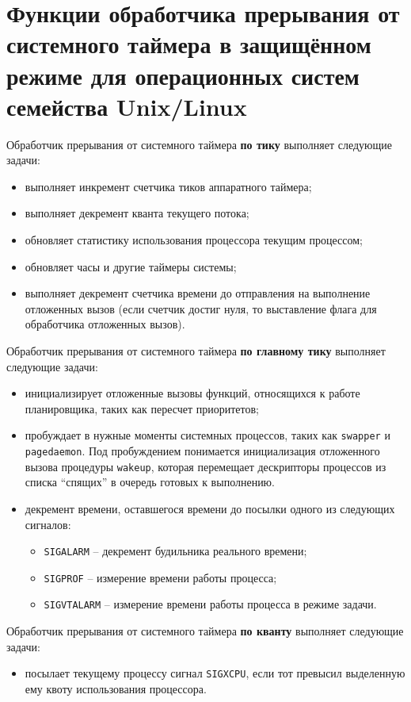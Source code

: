 \chapter{Функции обработчика прерывания от системного таймера в защищённом режиме для операционных систем семейства Unix/Linux}

Обработчик прерывания от системного таймера \textbf{по тику} выполняет следующие задачи:
\begin{itemize}
    \item выполняет инкремент счетчика тиков аппаратного таймера;
    \item выполняет декремент кванта текущего потока;
    \item обновляет статистику использования процессора текущим процессом;
    \item обновляет часы и другие таймеры системы;
    \item выполняет декремент счетчика времени до отправления на выполнение отложенных вызов (если счетчик достиг нуля, то выставление флага для обработчика отложенных вызов).
\end{itemize}

Обработчик прерывания от системного таймера \textbf{по главному тику} выполняет следующие задачи:
\begin{itemize}
    \item инициализирует отложенные вызовы функций, относящихся к работе планировщика, таких как пересчет приоритетов;
    \item пробуждает в нужные моменты системных процессов, таких как \texttt{swapper} и \texttt{pagedaemon}. 
        Под пробуждением понимается инициализация отложенного вызова процедуры \texttt{wakeup}, которая перемещает дескрипторы процессов из списка ``спящих'' в очередь готовых к выполнению.
    \item декремент времени, оставшегося времени до посылки одного из следующих сигналов:
        \begin{itemize}
            \item \texttt{SIGALARM} – декремент будильника реального времени;
            \item \texttt{SIGPROF} – измерение времени работы процесса;
            \item \texttt{SIGVTALARM} – измерение времени работы процесса в режиме задачи.
        \end{itemize}
\end{itemize}

Обработчик прерывания от системного таймера \textbf{по кванту} выполняет следующие задачи:
\begin{itemize}
    \item посылает текущему процессу сигнал \texttt{SIGXCPU}, если тот превысил выделенную ему квоту использования процессора.
\end{itemize}


